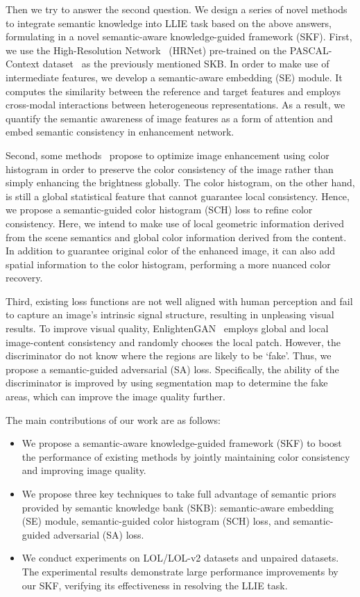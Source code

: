 \documentclass[10pt,twocolumn,letterpaper]{article}
\begin{document}
Then we try to answer the second question.
We design a series of novel methods to integrate semantic knowledge into LLIE task based on the above answers, formulating in a novel semantic-aware knowledge-guided framework (SKF). First, we use the High-Resolution Network~\cite{wang2020hrnet} (HRNet) pre-trained on the PASCAL-Context dataset~\cite{mottaghi2014pascalcontext} as the previously mentioned SKB. In order to make use of intermediate features, we develop a semantic-aware embedding (SE) module. It computes the similarity between the reference and target features and employs cross-modal interactions between heterogeneous representations. As a result, we quantify the semantic awareness of image features as a form of attention and embed semantic consistency in enhancement network.

Second, some methods~\cite{zhang2022colordccnet,kim2022colorhistloss} propose to optimize image enhancement using color histogram in order to preserve the color consistency of the image rather than simply enhancing the brightness globally. The color histogram, on the other hand, is still a global statistical feature that cannot guarantee local consistency. Hence, we propose a semantic-guided color histogram (SCH) loss to refine color consistency. Here, we intend to make use of local geometric information derived from the scene semantics and global color information derived from the content. In addition to guarantee original color of the enhanced image, it can also add spatial information to the color histogram, performing a more nuanced color recovery.

Third, existing loss functions are not well aligned with human perception and fail to capture an image's intrinsic signal structure, resulting in unpleasing visual results. To improve visual quality, EnlightenGAN~\cite{jiang2021enlightengan} employs global and local image-content consistency and randomly chooses the local patch. However, the discriminator do not know where the regions are likely to be `fake'. Thus, we propose a semantic-guided adversarial (SA) loss. Specifically, the ability of the discriminator is improved by using segmentation map to determine the fake areas, which can improve the image quality further.


The main contributions of our work are as follows:
\vspace{-0.2cm}
\begin{itemize}
\setlength{\itemsep}{0pt}
\setlength{\parskip}{2pt}
\item We propose a semantic-aware knowledge-guided framework (SKF) to boost the performance of existing methods by jointly maintaining color consistency and improving image quality.
    \item We propose three key techniques to take full advantage of semantic priors provided by semantic knowledge bank (SKB): semantic-aware embedding (SE) module, semantic-guided color histogram (SCH) loss, and semantic-guided adversarial (SA) loss.
    \item We conduct experiments on LOL/LOL-v2 datasets and unpaired datasets. The experimental results demonstrate large performance improvements by our SKF, verifying its effectiveness in resolving the LLIE task.
\end{itemize}
\end{document}
